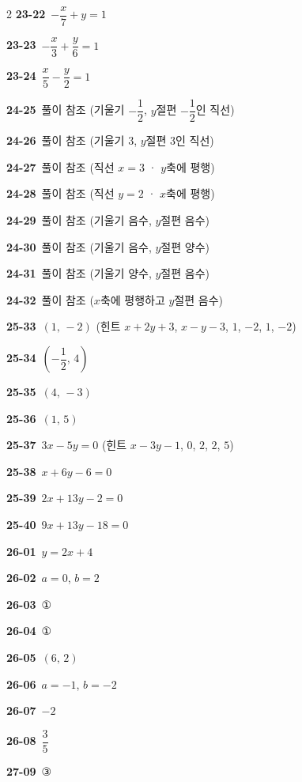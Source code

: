 \documentclass[10pt,a4paper]{article}
\begin{document}
\begin{multicols}{2}
\noindent\textbf{23-22}\ $-\dfrac{x}{7}+y=1$\par
\noindent\textbf{23-23}\ $-\dfrac{x}{3}+\dfrac{y}{6}=1$\par
\noindent\textbf{23-24}\ $\dfrac{x}{5}-\dfrac{y}{2}=1$\par
\noindent\textbf{24-25}\ 풀이 참조 (기울기 $-\dfrac{1}{2}$, $y$절편 $-\dfrac{1}{2}$인 직선)\par
\noindent\textbf{24-26}\ 풀이 참조 (기울기 $3$, $y$절편 $3$인 직선)\par
\noindent\textbf{24-27}\ 풀이 참조 (직선 $x=3$ · $y$축에 평행)\par
\noindent\textbf{24-28}\ 풀이 참조 (직선 $y=2$ · $x$축에 평행)\par
\noindent\textbf{24-29}\ 풀이 참조 (기울기 음수, $y$절편 음수)\par
\noindent\textbf{24-30}\ 풀이 참조 (기울기 음수, $y$절편 양수)\par
\noindent\textbf{24-31}\ 풀이 참조 (기울기 양수, $y$절편 음수)\par
\noindent\textbf{24-32}\ 풀이 참조 ($x$축에 평행하고 $y$절편 음수)\par
\noindent\textbf{25-33}\ $(1,\,-2)$ (힌트 $x+2y+3$, $x-y-3$, $1$, $-2$, $1$, $-2$)\par
\noindent\textbf{25-34}\ $\left(-\dfrac{1}{2},\,4\right)$\par
\noindent\textbf{25-35}\ $(4,\,-3)$\par
\noindent\textbf{25-36}\ $(1,\,5)$\par
\noindent\textbf{25-37}\ $3x-5y=0$ (힌트 $x-3y-1$, $0$, $2$, $2$, $5$)\par
\noindent\textbf{25-38}\ $x+6y-6=0$\par
\noindent\textbf{25-39}\ $2x+13y-2=0$\par
\noindent\textbf{25-40}\ $9x+13y-18=0$\par
\noindent\textbf{26-01}\ $y=2x+4$\par
\noindent\textbf{26-02}\ $a=0$, $b=2$\par
\noindent\textbf{26-03}\ ①\par
\noindent\textbf{26-04}\ ①\par
\noindent\textbf{26-05}\ $(6,\,2)$\par
\noindent\textbf{26-06}\ $a=-1$, $b=-2$\par
\noindent\textbf{26-07}\ $-2$\par
\noindent\textbf{26-08}\ $\dfrac{3}{5}$\par
\noindent\textbf{27-09}\ ③\par

\end{multicols}
\end{document}
